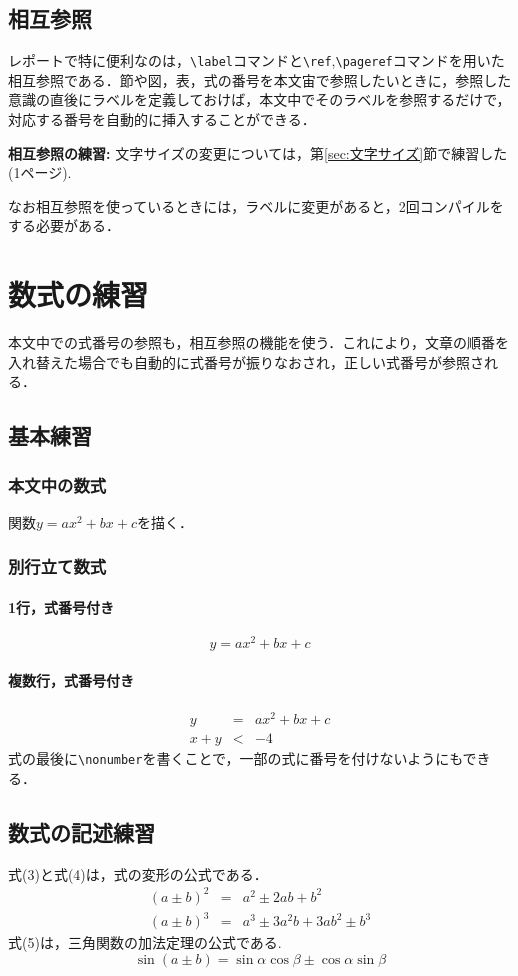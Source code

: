 \documentclass[titlepage]{jarticle}
\begin{document}
\subsection{相互参照}
レポートで特に便利なのは，\verb|\label|コマンドと\verb|\ref|,\verb|\pageref|コマンドを用いた相互参照である．節や図，表，式の番号を本文宙で参照したいときに，参照した意識の直後にラベルを定義しておけば，本文中でそのラベルを参照するだけで，対応する番号を自動的に挿入することができる．

\textbf{相互参照の練習: }文字サイズの変更については，第\ref{sec:文字サイズ}節で練習した(1ページ).

なお相互参照を使っているときには，ラベルに変更があると，2回コンパイルをする必要がある．

\section{数式の練習}
本文中での式番号の参照も，相互参照の機能を使う．これにより，文章の順番を入れ替えた場合でも自動的に式番号が振りなおされ，正しい式番号が参照される．
\subsection{基本練習}
\subsubsection{本文中の数式}
関数$y = ax^{2} + bx + c$を描く．
\subsubsection{別行立て数式}
\paragraph{1行，式番号付き}
\begin{equation}
y = ax^{2} + bx + c
\end{equation}

\paragraph{複数行，式番号付き}
\begin{eqnarray}
y &=& ax^{2} + bx + c\\
x + y &<& -4\nonumber
\end{eqnarray}
式の最後に\verb|\nonumber|を書くことで，一部の式に番号を付けないようにもできる．

\subsection{数式の記述練習}
式(3)と式(4)は，式の変形の公式である．
\begin{eqnarray}
(a \pm b)^{2} &=& a^{2} \pm 2ab + b^{2}\\
(a \pm b)^{3} &=& a^{3} \pm 3a^{2}b + 3ab^{2} \pm b^{3}
\end{eqnarray}
式(5)は，三角関数の加法定理の公式である.
\begin{equation}
\sin(a \pm b) = \sin{\alpha}\cos{\beta} {\pm} \cos{\alpha}\sin{\beta}
\end{equation}
\end{document}
